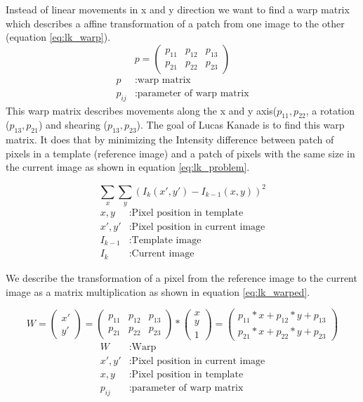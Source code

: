 \documentclass[11pt,a4paper,titlepage,oneside]{report}
\begin{document}
Instead of linear movements in x and y direction we want to find a warp matrix which describes a affine transformation of a patch from one image to the other (equation \ref{eq:lk_warp}).
\begin{equation}\label{eq:lk_warp}
	p=\begin{pmatrix}
		p_{11} & p_{12} & p_{13} \\
		p_{21} & p_{22} & p_{23}
	\end{pmatrix}
\end{equation}
\begin{align*}
	p				&:	\text{warp matrix}\\
	p_{ij}	&:	\text{parameter of warp matrix}
\end{align*}
This warp matrix describes movements along the x and y axis($p_{11},p_{22}$, a rotation ($p_{13},p_{21}$) and shearing ($p_{13},p_{23}$). The goal of Lucas Kanade is to find this warp matrix. It does that by minimizing the Intensity difference between patch of pixels in a template (reference image) and a patch of pixels with the same size in the current image as shown in equation \ref{eq:lk_problem}. 

\begin{equation}\label{eq:lk_problem}
	\sum_x\sum_y(I_{k}(x',y')-I_{k-1}(x,y))^2
\end{equation}
\begin{align*}
	x,y				&:	\text{Pixel position in template}\\
	x',y'			&:	\text{Pixel position in current image}\\
	I_{k-1}		&:	\text{Template image}\\
	I_{k}			&:	\text{Current image}
\end{align*}

We describe the transformation of a pixel from the reference image to the current image as a matrix multiplication as shown in equation \ref{eq:lk_warped}.

\begin{equation}\label{eq:lk_warped}
	W=
	\begin{pmatrix}
		x' \\
		y'
	\end{pmatrix}=
	\begin{pmatrix}
		p_{11} & p_{12} & p_{13} \\
		p_{21} & p_{22} & p_{23}
	\end{pmatrix}*
	\begin{pmatrix}
		x\\
		y\\
		1
	\end{pmatrix}=
	\begin{pmatrix}
		p_{11}*x + p_{12}*y + p_{13} \\
		p_{21}*x + p_{22}*y + p_{23}
	\end{pmatrix}
\end{equation}
\begin{align*}
	W					&:	\text{Warp}\\
	x',y'			&:	\text{Pixel position in current image}\\
	x,y				&:	\text{Pixel position in template}\\
	p_{ij}		&:	\text{parameter of warp matrix}
\end{align*}
\end{document}
